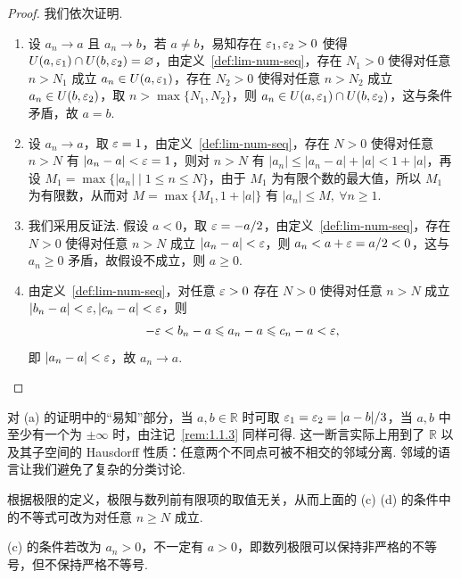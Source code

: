 \documentclass[../main.tex]{subfiles}
\begin{document}
\begin{proof}
    我们依次证明. 
    \begin{enumerate}[label=(\alph*)]
        \item 设 $a_n \to a$ 且 $a_n \to b$，若 $a \neq b$，易知存在 $\varepsilon_1, \varepsilon_2 > 0$ 使得 $U(a, \varepsilon_1) \cap U(b, \varepsilon_2) = \varnothing$，由定义~\ref{def:lim-num-seq}，存在 $N_1 > 0$ 使得对任意 $n > N_1$ 成立 $a_n \in U(a, \varepsilon_1)$，存在 $N_2 > 0$ 使得对任意 $n > N_2$ 成立 $a_n \in U(b, \varepsilon_2)$，取 $n > \max\{N_1, N_2\}$，则 $a_n \in U(a, \varepsilon_1) \cap U(b, \varepsilon_2)$，这与条件矛盾，故 $a = b$. 

        \item 设 $a_n \to a$，取 $\varepsilon = 1$，由定义~\ref{def:lim-num-seq}，存在 $N > 0$ 使得对任意 $n > N$ 有 $|a_n - a| < \varepsilon = 1$，则对 $n > N$ 有 $|a_n| \leqslant |a_n - a| + |a| < 1 + |a|$，再设 $M_1 = \max\{|a_n| \mid 1 \leqslant n \leqslant N\}$，由于 $M_1$ 为有限个数的最大值，所以 $M_1$ 为有限数，从而对 $M = \max\{M_1, 1 + |a|\}$ 有 $|a_n| \leqslant M, \ \forall n \geqslant 1$. 

        \item 我们采用反证法. 假设 $a < 0$，取 $\varepsilon = - a / 2$，由定义~\ref{def:lim-num-seq}，存在 $N > 0$ 使得对任意 $n > N$ 成立 $|a_n - a| < \varepsilon$，则 $a_n < a + \varepsilon = a / 2 < 0$，这与 $a_n \geqslant 0$ 矛盾，故假设不成立，则 $a \geqslant 0$. 

        \item 由定义~\ref{def:lim-num-seq}，对任意 $\varepsilon > 0$ 存在 $N > 0$ 使得对任意 $n > N$ 成立 $|b_n - a| < \varepsilon, |c_n - a| < \varepsilon$，则 
        $$
        -\varepsilon < b_n - a \leqslant a_n - a \leqslant c_n - a < \varepsilon, 
        $$
        即 $|a_n - a| < \varepsilon$，故 $a_n \to a$. \qedhere
    \end{enumerate}
\end{proof}

\begin{remark}
    对 (a) 的证明中的“易知”部分，当 $a, b \in \mathbb R$ 时可取 $\varepsilon_1 = \varepsilon_2 = |a - b| / 3$，当 $a, b$ 中至少有一个为 $\pm \infty$ 时，由注记~\ref{rem:1.1.3} 同样可得. 这一断言实际上用到了 $\mathbb R$ 以及其子空间的 Hausdorff 性质：任意两个不同点可被不相交的邻域分离. 邻域的语言让我们避免了复杂的分类讨论. 

    根据极限的定义，极限与数列前有限项的取值无关，从而上面的 (c) (d) 的条件中的不等式可改为对任意 $n \geqslant N$ 成立. 

    (c) 的条件若改为 $a_n > 0$，不一定有 $a > 0$，即数列极限可以保持非严格的不等号，但不保持严格不等号. 
\end{remark}
\end{document}
